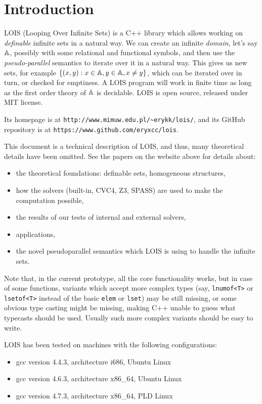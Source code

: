 \vspace{-2em}
\section{Introduction}\label{sec_intro}

LOIS (Looping Over Infinite Sets) is a C++ library which allows working on 
\emph{definable} infinite sets in a natural way. We can create an infinite
\emph{domain}, let's say ${\mathbb A}$, possibly with some relational and functional symbols, 
and then use the \emph{pseudo-parallel} semantics to iterate over it in a natural way. 
This gives us new sets, for example $\{(x,y): x \in {\mathbb A}, y \in {\mathbb A}, x \neq y\}$,
which can be iterated over in turn, or checked for emptiness. A LOIS program will
work in finite time as long as the first order theory of ${\mathbb A}$ is decidable.
LOIS is open source, released under MIT license.

Its homepage is at
{\tt http://www.mimuw.edu.pl/\textasciitilde erykk/lois/},
and its GitHub repository is at
{\tt https://www.github.com/eryxcc/lois}.


This document is a technical description of LOIS, and thus, many theoretical details
have been omitted. See the papers on the website above for details about:

\begin{itemize}
\item the theoretical foundations: definable sets, homogeneous structures, \cite{lois-sat}
\item how the solvers (built-in, CVC4, Z3, SPASS) are used to make the computation
possible, \cite{lois-sat}
\item the results of our tests of internal and external solvers, \cite{lois-sat}
\item applications, \cite{lois-sat}
\item the novel pseudoparallel semantics which LOIS is using to handle the infinite sets.
\cite{lois-sem}
\end{itemize}

Note that, in the current prototype, all the core functionality works, but in case of
some functions, variants which accept more complex types (say, {\tt lnumof<T>} or {\tt
lsetof<T>} instead of the basic {\tt elem} or {\tt lset}) may be still missing,
or some obvious type casting might be missing, making C++ unable to guess
what typecasts should be used.
Usually
such more complex variants should be easy to write.

LOIS has been tested on machines with the following configurations:
\begin{itemize}
\item gcc version 4.4.3, architecture i686, Ubuntu Linux
\item gcc version 4.6.3, architecture x86\_64, Ubuntu Linux
\item gcc version 4.7.3, architecture x86\_64, PLD Linux
\end{itemize}

